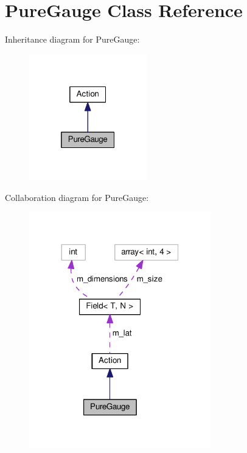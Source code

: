 \hypertarget{classPureGauge}{}\section{Pure\+Gauge Class Reference}
\label{classPureGauge}


Inheritance diagram for Pure\+Gauge\+:
\nopagebreak
\begin{figure}[H]
\begin{center}
\leavevmode
\includegraphics[width=145pt]{classPureGauge__inherit__graph}
\end{center}
\end{figure}


Collaboration diagram for Pure\+Gauge\+:
\nopagebreak
\begin{figure}[H]
\begin{center}
\leavevmode
\includegraphics[width=224pt]{classPureGauge__coll__graph}
\end{center}
\end{figure}
